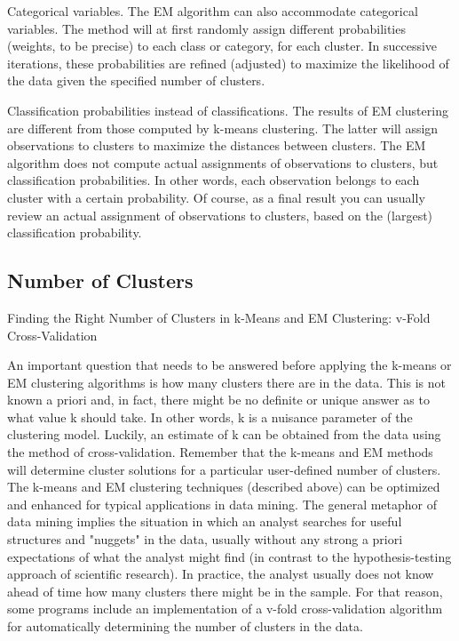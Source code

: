 Categorical variables. The EM algorithm can also accommodate categorical variables. The method will at first randomly assign different probabilities (weights, to be precise) to each class or category, for each cluster. In successive iterations, these probabilities are refined (adjusted) to maximize the likelihood of the data given the specified number of clusters.

Classification probabilities instead of classifications. The results of EM clustering are different from those computed by k-means clustering. The latter will assign observations to clusters to maximize the distances between clusters. The EM algorithm does not compute actual assignments of observations to clusters, but classification probabilities. In other words, each observation belongs to each cluster with a certain probability. Of course, as a final result you can usually review an actual assignment of observations to clusters, based on the (largest) classification probability.


\subsection*{Number of Clusters}

 
Finding the Right Number of Clusters in k-Means and EM Clustering: v-Fold Cross-Validation

An important question that needs to be answered before applying the k-means or EM clustering algorithms is how many clusters there are in the data. This is not known a priori and, in fact, there might be no definite or unique answer as to what value k should take. In other words, k is a nuisance parameter of the clustering model. Luckily, an estimate of k can be obtained from the data using the method of cross-validation. Remember that the k-means and EM methods will determine cluster solutions for a particular user-defined number of clusters. The k-means and EM clustering techniques (described above) can be optimized and enhanced for typical applications in data mining. The general metaphor of data mining implies the situation in which an analyst searches for useful structures and "nuggets" in the data, usually without any strong a priori expectations of what the analyst might find (in contrast to the hypothesis-testing approach of scientific research). In practice, the analyst usually does not know ahead of time how many clusters there might be in the sample. For that reason, some programs include an implementation of a v-fold cross-validation algorithm for automatically determining the number of clusters in the data.


